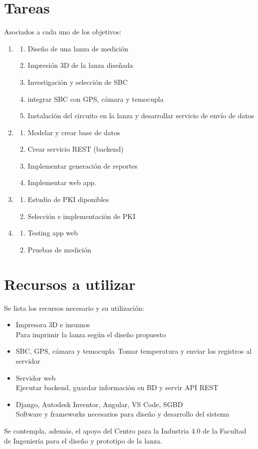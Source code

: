 \documentclass[12pt, letterpaper]{article}
\begin{document}
\section{Tareas}
Asociados a cada uno de los objetivos:
\begin{enumerate}
	\item
	\begin{enumerate}
		\item Diseño de una lanza de medición
		\item Impresión 3D de la lanza diseñada
		\item Investigación y selección de SBC
		\item integrar SBC con GPS, cámara y temocupla
		\item Instalación del circuito en la lanza y desarrollar servicio de envío de datos
	\end{enumerate}
	\item
	\begin{enumerate}
		\item Modelar y crear base de datos
		\item Crear servicio REST (backend)
		\item Implementar generación de reportes
		\item Implementar web app.
	\end{enumerate}
	\item
	\begin{enumerate}
		\item Estudio de PKI diponibles
		\item Selección e implementación de PKI
	\end{enumerate}
	\item
	\begin{enumerate}
		
		\item Testing app web
		\item Pruebas de medición
	\end{enumerate}
\end{enumerate}
\section{Recursos a utilizar}
Se lista los recursos necesario y su utilización:
\begin{itemize}
	\item Impresora 3D e insumos\\
	Para imprimir la lanza según el diseño propuesto
	\item SBC, GPS, cámara y temocupla\
	Tomar temperatura y enviar los registros al servidor
	\item Servidor web\\
	Ejecutar backend, guardar información en BD y servir API REST
	\item  Django, Autodesk Inventor, Angular, VS Code, SGBD\\
	Software y frameworks necesarios para diseño y desarrollo del sistema
	
\end{itemize}
Se contempla, además, el apoyo del Centro para la Industria 4.0 de la Facultad de Ingeniería para el diseño y prototipo de la lanza.
\end{document}

